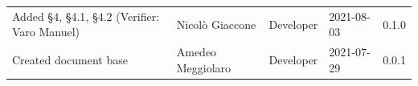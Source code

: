\documentclass[a4paper]{article}
\begin{document}
\begin{center}
\begin{table}[h!]
\begin{tabular}{p{150px} p{90px} p{80px} p{60px} p{45px}}
            Added \S{4}, \S{4.1}, \S{4.2}  \newline(Verifier: Varo Manuel)                                                                                       & Nicolò Giaccone   & Developer     & 2021-08-03    & 0.1.0            \\
            Created document base                                                                                                                                & Amedeo Meggiolaro & Developer     & 2021-07-29    & 0.0.1            \\
        \end{tabular}
    \end{table}
\end{center}

\newpage
\tableofcontents
\newpage
\newpage
\listoffigures
\newpage







\end{document}
